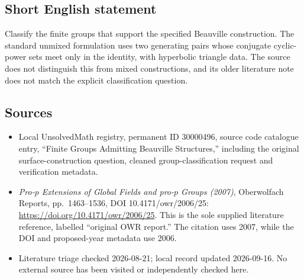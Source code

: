 \documentclass[11pt]{article}
\begin{document}
\subsection{Short English statement}
Classify the finite groups that support the specified Beauville construction. The standard unmixed formulation uses two generating pairs whose conjugate cyclic-power sets meet only in the identity, with hyperbolic triangle data. The source does not distinguish this from mixed constructions, and its older literature note does not match the explicit classification question.
\subsection{Sources}
\begin{itemize}
\item Local UnsolvedMath registry, permanent ID 30000496, source code catalogue entry, ``Finite Groups Admitting Beauville Structures,'' including the original surface-construction question, cleaned group-classification request and verification metadata.
\item \emph{Pro-\(p\) Extensions of Global Fields and pro-\(p\) Groups (2007)}, Oberwolfach Reports, pp.\ 1463--1536, DOI 10.4171/owr/2006/25: \url{https://doi.org/10.4171/owr/2006/25}. This is the sole supplied literature reference, labelled ``original OWR report.'' The citation uses 2007, while the DOI and proposed-year metadata use 2006.
\item Literature triage checked 2026-08-21; local record updated 2026-09-16. No external source has been visited or independently checked here.
\end{itemize}
\end{document}

